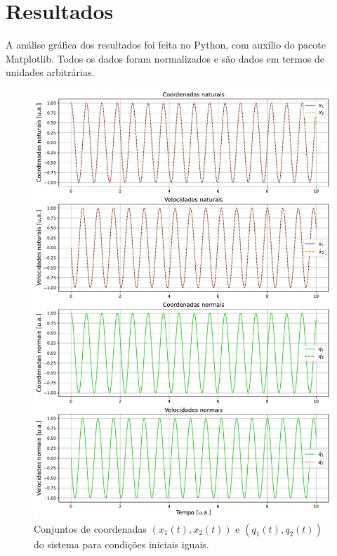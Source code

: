 \documentclass[a4paper, 11pt]{article}
\begin{document}
\section{ Resultados }

    A análise gráfica dos resultados foi feita no Python, com auxílio do pacote Matplotlib. Todos os dados foram normalizados e são dados em termos de unidades arbitrárias.
    
    \begin{figure}[h!]
        \centering
        \includegraphics[width=1\linewidth]{graph_coordenadas_iguais.pdf}
        \caption{ Conjuntos de coordenadas $(x_1(t),x_2(t))$ e $(q_1(t),q_2(t))$ do sistema para condições iniciais iguais.
        \label{figura :: coordenadas condições iguais}}
    \end{figure}
\end{document}
